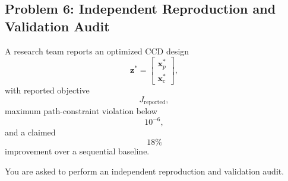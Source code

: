 \subsection*{Problem 6: Independent Reproduction and Validation Audit}

A research team reports an optimized CCD design
\begin{equation}
\mathbf{z}^*
=
\begin{bmatrix}
\mathbf{x}_p^*\\
\mathbf{x}_c^*
\end{bmatrix},
\end{equation}
with reported objective
\begin{equation}
J_{\mathrm{reported}},
\end{equation}
maximum path-constraint violation below
\begin{equation}
10^{-6},
\end{equation}
and a claimed
\begin{equation}
18\%
\end{equation}
improvement over a sequential baseline.

You are asked to perform an independent reproduction and validation audit.

